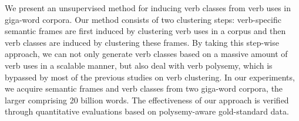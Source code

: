 We present an unsupervised method for inducing verb classes from verb uses in giga-word corpora. Our method consists of two clustering steps: verb-specific semantic frames are first induced by clustering verb uses in a corpus and then verb classes are induced by clustering these frames. By taking this step-wise approach, we can not only generate verb classes based on a massive amount of verb uses in a scalable manner, but also deal with verb polysemy, which is bypassed by most of the previous studies on verb clustering. In our experiments, we acquire semantic frames and verb classes from two giga-word corpora, the larger comprising 20 billion words. The effectiveness of our approach is verified through quantitative evaluations based on polysemy-aware gold-standard data.

